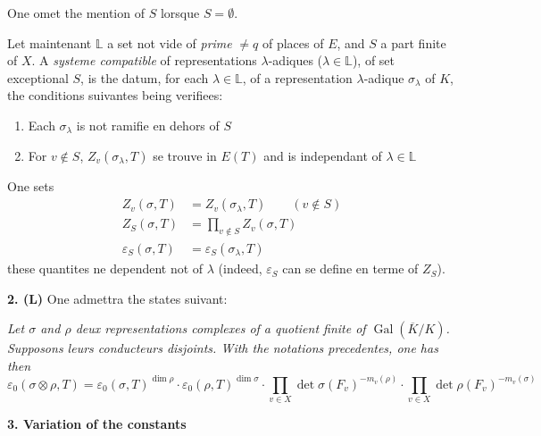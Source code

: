 \documentclass[11pt,a4paper]{article}
\theoremstyle{plain}
\DeclareMathOperator{\Gal}{Gal}
\begin{document}
One omet the mention of $S$ lorsque $S = \emptyset$.

\vspace{0.5cm}

Let maintenant $\mathbb{L}$ a set not vide of \emph{prime} $\neq q$ of places of $E$, and $S$ a part finite of $X$. A \emph{systeme compatible} of representations $\lambda$-adiques ($\lambda \in \mathbb{L}$), of set exceptional $S$, is the datum, for each $\lambda \in \mathbb{L}$, of a representation $\lambda$-adique $\sigma_\lambda$ of $K$, the conditions suivantes being verifiees:

\begin{enumerate}[label=(\roman*)]
\item Each $\sigma_\lambda$ is not ramifie en dehors of $S$
\item For $v \notin S$, $Z_v(\sigma_\lambda, T)$ se trouve in $E(T)$ and is independant of $\lambda \in \mathbb{L}$
\end{enumerate}

One sets
\begin{align*}
Z_v(\sigma, T) &= Z_v(\sigma_\lambda, T) \qquad (v \notin S) \\
Z_S(\sigma, T) &= \prod_{v \notin S} Z_v(\sigma, T) \\
\varepsilon_S(\sigma, T) &= \varepsilon_S(\sigma_\lambda, T)
\end{align*}
these quantites ne dependent not of $\lambda$ (indeed, $\varepsilon_S$ can se define en terme of $Z_S$).

\vspace{0.5cm}

\noindent\textbf{2. (L)} \quad One admettra the states suivant:

\smallskip

\textit{Let $\sigma$ and $\rho$ deux representations complexes of a quotient finite of $\Gal(\overline{K}/K)$. Supposons leurs conducteurs disjoints. With the notations precedentes, one has then}
\begin{equation}\tag{L}
\varepsilon_0(\sigma \otimes \rho, T) = \varepsilon_0(\sigma, T)^{\dim \rho} \cdot \varepsilon_0(\rho, T)^{\dim \sigma} \cdot \prod_{v \in X} \det \sigma(F_v)^{-m_v(\rho)} \cdot \prod_{v \in X} \det \rho(F_v)^{-m_v(\sigma)}
\end{equation}

\newpage

\noindent\textbf{3. Variation of the constants}

\vspace{0.3cm}
\end{document}
